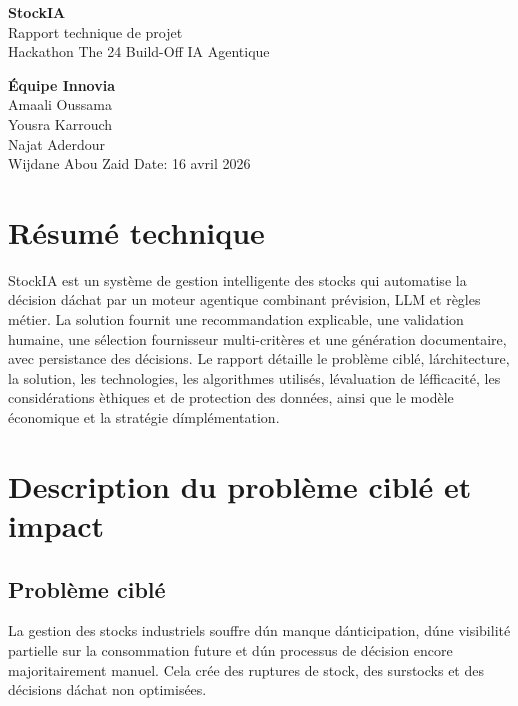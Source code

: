 \documentclass[12pt,a4paper]{report}
\begin{document}
\begin{titlepage}
  \centering
  \vspace*{2cm}
  {\Huge\bfseries StockIA\\}
  \vspace{0.6cm}
  {\Large Rapport technique de projet\\}
  \vspace{0.4cm}
  {\large Hackathon The 24 Build-Off IA Agentique\\}
  \vspace{1.2cm}
 
  \vspace{0.6cm}
  {\large \textbf{\'Equipe Innovia}\\}
  \vspace{0.3cm}
  {\large Amaali Oussama\\
  Yousra Karrouch\\
  Najat Aderdour\\
  Wijdane Abou Zaid}
  \vfill
  {\large Date: 16 avril 2026}
\end{titlepage}

\tableofcontents
\cleardoublepage

\chapter*{R\'esum\'e technique}
StockIA est un syst\`eme de gestion intelligente des stocks qui automatise la d\'ecision d\'achat par un moteur agentique combinant pr\'evision, LLM et r\`egles m\'etier. La solution fournit une recommandation explicable, une validation humaine, une s\'election fournisseur multi-crit\`eres et une g\'en\'eration documentaire, avec persistance des d\'ecisions. Le rapport d\'etaille le probl\`eme cibl\'e, l\'architecture, la solution, les technologies, les algorithmes utilis\'es, l\'evaluation de l\'efficacit\'e, les consid\'erations \`ethiques et de protection des donn\'ees, ainsi que le mod\`ele \'economique et la strat\'egie d\'impl\'ementation.

\cleardoublepage
{}

\chapter{Description du probl\`eme cibl\'e et impact}
\section{Probl\`eme cibl\'e}
La gestion des stocks industriels souffre d\'un manque d\'anticipation, d\'une visibilit\'e partielle sur la consommation future et d\'un processus de d\'ecision encore majoritairement manuel. Cela cr\'ee des ruptures de stock, des surstocks et des d\'ecisions d\'achat non optimis\'ees.
\end{document}
